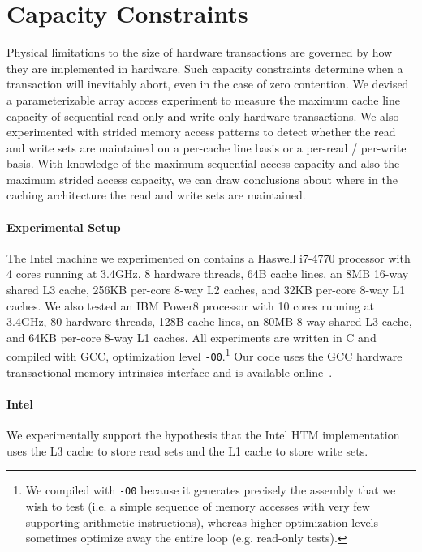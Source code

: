 \section{Capacity Constraints}
\label{sec:capacity}
Physical limitations to the size of hardware 
transactions are
governed by how they are implemented in hardware. 
Such capacity constraints
determine when a transaction will inevitably abort, 
even in the case of zero contention. We 
devised a parameterizable array access
experiment to measure the maximum cache line capacity 
of sequential read-only and write-only
hardware transactions. We also experimented with strided 
memory access patterns
to detect whether the read and write sets are maintained
on a per-cache line basis or a per-read / per-write basis.
With knowledge of the maximum sequential access 
capacity and also the maximum
strided access capacity, we can draw conclusions 
about where in the caching
architecture the read and write sets are 
maintained. 

\paragraph{Experimental Setup}
The Intel machine we experimented on contains a Haswell i7-4770 processor with 4
cores running at 3.4GHz, 8 hardware threads, 64B cache lines, an 8MB 16-way
shared L3 cache, 256KB per-core 8-way L2 caches, and 32KB per-core 8-way L1
caches. We also tested an IBM Power8 processor with 10 cores running at 3.4GHz,
80 hardware threads, 128B cache lines, an 80MB 8-way shared L3 cache, and 64KB
per-core 8-way L1 caches. All experiments are written in C and compiled with
GCC, optimization level \texttt{-O0}.\footnote{We compiled with \texttt{-O0}
because it generates precisely the assembly that we wish to test (i.e. a simple
sequence of memory accesses with very few supporting arithmetic instructions), whereas
higher optimization levels sometimes optimize away the entire loop (e.g.
read-only tests).} Our code uses the GCC
hardware transactional memory intrinsics interface and is available
online~\cite{Nguyen15}.

\paragraph{Intel}
We experimentally support the hypothesis
that the Intel HTM implementation uses the L3 cache to 
store read sets and the L1 cache to store write sets.

